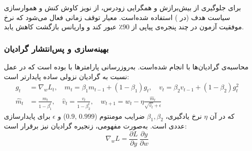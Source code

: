 برای جلوگیری از بیش‌برازش و همگرایی زودرس، از نویز کاوش کنش و هموارسازی سیاست هدف (در ) استفاده شده‌است. معیار توقف زمانی فعال می‌شود که نرخ موفقیت آزمون در چند پنجره‌ی پیاپی از 90٪ عبور کند و واریانس بازگشت کاهش یابد.

\subsubsection*{بهینه‌سازی و پس‌انتشار گرادیان}
محاسبه‌ی گرادیان‌ها با  انجام شده‌است. به‌روزرسانی پارامترها با   
\cite{kingma2017adammethodstochasticoptimization}
بوده است که در عمل نسبت به گرادیان نزولی ساده پایدارتر است:
\begin{align}
  g_t &= \nabla_{\!w} L_t,\quad
  m_t = \beta_1 m_{t-1} + (1-\beta_1) g_t,\quad
  v_t = \beta_2 v_{t-1} + (1-\beta_2) g_t^2 \nonumber\\
  \hat{m}_t &= \frac{m_t}{1-\beta_1^t},\quad
  \hat{v}_t = \frac{v_t}{1-\beta_2^t},\quad
  w_{t+1} = w_t - \eta \frac{\hat{m}_t}{\sqrt{\hat{v}_t} + \epsilon}
\end{align}
که در آن \(\eta\) نرخ یادگیری، \(\beta_1,\beta_2\) ضرایب مومنتوم (\(0.9,\,0.999\)) و \(\epsilon\) برای پایدارسازی عددی است. به‌صورت مفهومی، زنجیره گرادیان نیز برقرار است:
\begin{equation}
  \nabla_{\!w} L = \frac{\partial L}{\partial y}\,\frac{\partial y}{\partial w}
\end{equation}







